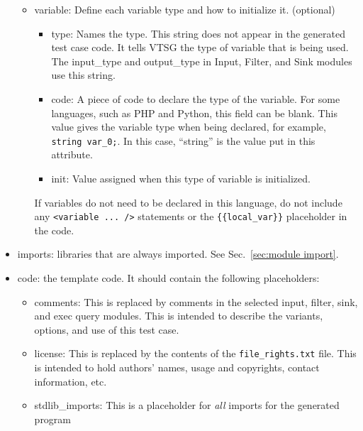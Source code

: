 \begin{itemize}
\begin{itemize}
        \item variable: Define each variable type and how to initialize it. (optional)
        \begin{itemize}
        \item type: Names the type. This string 
        does not appear in the generated test case code.  It tells VTSG
        the type of variable that is being used.  The input\_type
        and output\_type in Input, Filter, and Sink modules use
        this string.

        \item code: A piece of code to declare the type of the variable. For
        some languages, such as PHP and Python, this field can be blank. 
        This value gives the variable type when being declared, for example,
        \verb|string var_0;|.  In this case, ``string''
        is the value put in this attribute.

        \item init: Value assigned when this type of variable is initialized.
        \end{itemize}
        If variables do not need to be declared in this language, do not include
        any \verb|<variable ... />| statements or the \verb|{{local_var}}|
        placeholder in the code.
    \end{itemize}
    
    \item imports: libraries that are always imported.  See Sec.~\ref{sec:module import}.

    \item code: the template code. It should contain the 
    following placeholders:
    \label{sec:file template code}
    \begin{itemize}
        \item comments: This is replaced by comments in the selected input,
        filter, sink, and exec query modules.  This is intended to
        describe the variants, options, and use of this test case. 
        
        \item license: This is replaced by the contents of the
        \verb|file_rights.txt| file.  This is intended to hold
        authors' names, usage and copyrights, contact information, 
        etc.
        
        \item stdlib\_imports:  This is a placeholder for
        \emph{all} imports for the generated program


\end{itemize}
\end{itemize}
